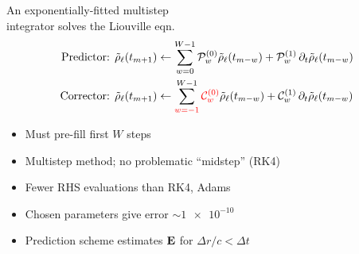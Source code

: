 \documentclass[12pt,usenames,dvipsnames]{beamer}
\begin{document}
\begin{frame}{An exponentially-fitted multistep \\ integrator solves the Liouville eqn.}
  \vspace{-0.5cm}
  \begin{align*}
    \text{Predictor: } \tilde{\rho}_\ell(t_{m + 1}) &\leftarrow \sum_{w = 0}^{W - 1} \mathcal{P}_w^{(0)} \tilde{\rho}_\ell(t_{m-w}) + \mathcal{P}_w^{(1)} \, \partial_t \tilde{\rho}_\ell(t_{m-w}) \\
    \text{Corrector: } \tilde{\rho}_\ell(t_{m + 1}) &\leftarrow \sum_{\textcolor{red}{w = -1}}^{W - 1} \textcolor{red}{\mathcal{C}_w^{(0)}} \tilde{\rho}_\ell(t_{m-w}) + \mathcal{C}_w^{(1)} \, \partial_t \tilde{\rho}_\ell(t_{m-w})
  \end{align*}
  \vspace{-0.5cm}
  \begin{itemize}
    \item Must pre-fill first $W$ steps
    \item Multistep method; no problematic ``midstep'' (RK4)
    \item Fewer RHS evaluations than RK4, Adams
    \item Chosen parameters give error $\sim \num{1e-10}$
    \item Prediction scheme estimates $\vb{E}$ for $\Delta r/c < \Delta t$
  \end{itemize}
  \vfill
\end{frame}

\begin{frame}
  \centering
  
\end{frame}
\end{document}
